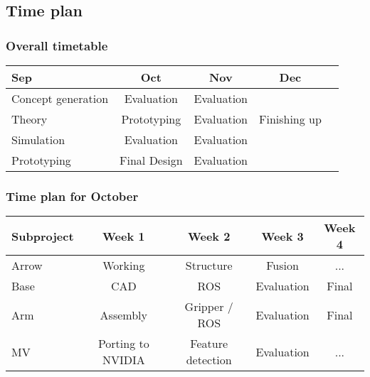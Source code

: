 \begin{frame}
    \subsection{Time plan}
    \frametitle{Overall timetable}
    \begin{table}
        \begin{tabular}{| l | c | c | c | c }
            
            Sep & Oct & Nov & Dec \\
            \hline \hline
            Concept generation & Evaluation & Evaluation &  \\ 
            \hline
            Theory & Prototyping & Evaluation & Finishing up \\
            \hline
            Simulation & Evaluation & Evaluation & \\
            \hline
            Prototyping & Final Design & Evaluation &  \\
            \hline
 
        \end{tabular}
    \end{table}    
\end{frame}

\begin{frame}
    
    \frametitle{Time plan for October}
    \begin{table}
        \begin{tabular}{l | c | c | c | c }
        Subproject & Week 1 & Week 2 & Week 3 & Week 4 \\
        \hline \hline
            Arrow & Working & Structure & Fusion & ...\\
            Base & CAD & ROS & Evaluation & Final\\
            Arm  & Assembly & Gripper / ROS & Evaluation & Final\\
            MV & Porting to NVIDIA & Feature detection & Evaluation & ...\\
        \end{tabular}
    \end{table}
\end{frame}